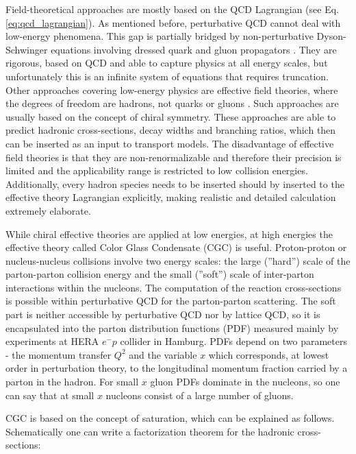 Field-theoretical approaches are mostly based on the QCD Lagrangian (see Eq.
\ref{eq:qcd_lagrangian}). As mentioned before, perturbative QCD cannot deal
with low-energy phenomena. This gap is partially bridged by
non-perturbative Dyson-Schwinger equations involving dressed quark and gluon
propagators \cite{Bashir:2012fs}.  They are rigorous, based on QCD and able to
capture physics at all energy scales, but unfortunately this is an infinite
system of equations that requires truncation. Other approaches covering
low-energy physics are effective field theories, where the degrees of freedom
are hadrons, not quarks or gluons \cite{Manohar:1996cq}. Such approaches are
usually based on the concept of chiral symmetry. These approaches are able to
predict hadronic cross-sections, decay widths and branching ratios, which then
can be inserted as an input to transport models. The disadvantage of effective
field theories is that they are non-renormalizable and therefore their
precision is limited and the applicability range is restricted
to low collision energies. Additionally, every hadron species needs to be inserted
should by inserted to the effective theory Lagrangian explicitly,
making realistic and detailed calculation extremely elaborate.

While chiral effective theories are applied at low energies, at high energies
the effective theory called Color Glass Condensate (CGC)
\cite{Gelis:2010nm,Iancu:2003xm} is useful. Proton-proton or nucleus-nucleus
collisions involve two energy scales: the large (''hard'') scale of the
parton-parton collision energy and the small (''soft'') scale of
inter-parton interactions within the nucleons. The computation of the reaction
cross-sections is possible within perturbative QCD for the 
parton-parton scattering. The soft part is neither accessible by perturbative
QCD nor by lattice QCD, so it is encapsulated into the parton distribution
functions (PDF) \cite{Pumplin:2002vw,Gluck:1994uf} measured mainly by
experiments at HERA $e^-p$ collider in Hamburg. PDFs depend on two parameters -
the momentum transfer $Q^2$ and the variable $x$ which
corresponds, at lowest order in perturbation theory, to the longitudinal
momentum fraction carried by a parton in the hadron. For small $x$ gluon PDFs
dominate in the nucleons, so one can say that at small $x$ nucleons consist
of a large number of gluons.

CGC is based on the concept of saturation, which can be explained as follows.
Schematically one can write a factorization theorem for the hadronic cross-sections:

